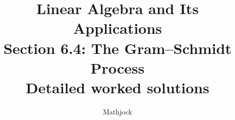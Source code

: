 
\title{\textbf{Linear Algebra and Its Applications}\\[0.3em]Section 6.4: The Gram–Schmidt Process\\[0.3em]\large Detailed worked solutions}
\author{Mathjock}
\date{}

\maketitle
\bookinfo
\tableofcontents
\clearpage
\renewcommand{\thesection}{6.\arabic{section}}
\renewcommand{\theHsection}{6.\arabic{section}}
\setcounter{section}{3}


